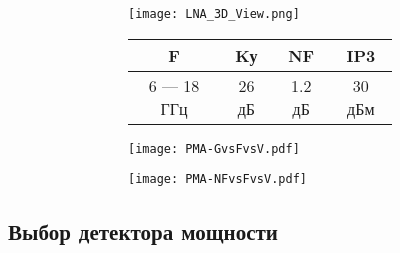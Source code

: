 \documentclass[c]{beamer}  %
\begin{document}
	\begin{frame}[shrink=30]
		\frametitle{\insertsection}
		\framesubtitle{\insertsubsection}
		
		\begin{figure}
			\begin{subfigure}[t]{0.5\textwidth}
				\vspace{-0.8\textheight}
				\begin{subfigure}[t]{\textwidth}
					\begin{center}
						\texttt{[image: LNA\_3D\_View.png]}
						\vspace*{0.05\textheight} 
					\end{center}
				\end{subfigure}
			
				\begin{subfigure}[b]{\textwidth}
					\begin{center}
						\begin{tabular}{|c|c|c|c|}
							\hline
							F & Kу & NF & IP3 \\
							\hline
							6 --- 18 ГГц & 26 дБ & 1.2 дБ & 30 дБм \\
							\hline
						\end{tabular}
					\end{center}
				\end{subfigure}
			\end{subfigure}%
			\begin{subfigure}[b]{0.5\textwidth}
					\begin{subfigure}[t]{\textwidth}
						\texttt{[image: PMA-GvsFvsV.pdf]}
					\end{subfigure}
				
					\begin{subfigure}[b]{\textwidth}
						\texttt{[image: PMA-NFvsFvsV.pdf]}
					\end{subfigure}
			\end{subfigure}
		\end{figure}
		
	\end{frame}

\subsection{Выбор детектора мощности}\label{susec:PD_choosing}
\end{document}
